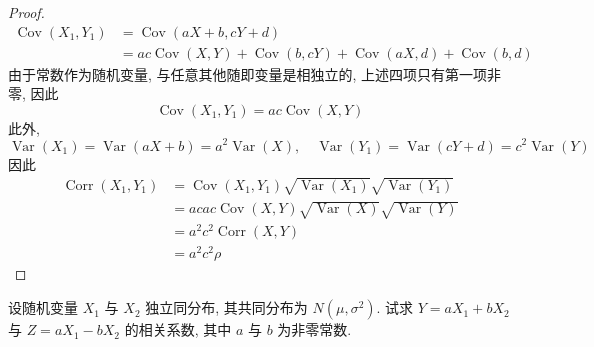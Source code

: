 \documentclass[../main.tex]{subfiles}
\begin{document}
\begin{proof}
     \[
    \begin{aligned}
     \operatorname{Cov}\left( X_1,Y_1 \right)&= \operatorname{Cov}\left( aX+ b,cY+ d \right)\\ 
      &= ac \operatorname{Cov}\left( X,Y \right)+ \operatorname{Cov}\left( b,cY \right)+  \operatorname{Cov}\left( aX,d \right)+  \operatorname{Cov}\left( b,d \right)      
    \end{aligned} 
     \]由于常数作为随机变量, 与任意其他随即变量是相独立的, 上述四项只有第一项非零, 因此 \[
     \operatorname{Cov}\left( X_1,Y_1 \right) =  ac \operatorname{Cov}\left( X,Y \right) 
     \]此外,  \[
     \operatorname{Var}\left( X_1 \right)= \operatorname{Var}\left( aX+ b \right)= a^{2}\operatorname{Var}\left( X \right),\quad \operatorname{Var}\left( Y_1 \right)= \operatorname{Var}\left( cY+ d \right)= c^{2}\operatorname{Var}\left( Y \right)      
     \]因此 \[
    \begin{aligned}
     \operatorname{Corr}\left( X_1,Y_1 \right)&= \operatorname{Cov}\left( X_1,Y_1 \right)\sqrt{\operatorname{Var}\left( X_1 \right) } \sqrt{\operatorname{Var}\left( Y_1 \right) } \\ 
      &=  ac  ac \operatorname{Cov}\left( X,Y \right)\sqrt{ \operatorname{Var}\left( X \right) } \sqrt{\operatorname{Var}\left( Y \right) }\\ 
       &= a^{2}c^{2} \operatorname{Corr}\left( X,Y \right)\\ 
        &= a^{2}c^{2}\rho  
    \end{aligned}  
     \]
\end{proof}
\begin{exercise}{}{}
设随机变量 $X_1$ 与 $X_2$ 独立同分布, 其共同分布为 $N(\mu,\sigma^2)$. 试求 $Y = aX_1 + bX_2$ 与 $Z = aX_1 - bX_2$ 的相关系数, 其中 $a$ 与 $b$ 为非零常数.
\end{exercise}
\end{document}
